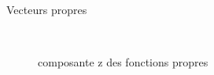 \documentclass{beamer}
\begin{document}
\begin{frame}{Vecteurs propres}
\begin{figure}[H]
{		\ 
	}
	\caption{composante z des fonctions propres}
	\label{resultats}
\end{figure}
\end{frame}
\end{document}
